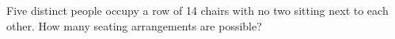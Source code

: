 Five distinct people occupy a row of 14 chairs with no two sitting next to each other. How many seating arrangements are possible?
